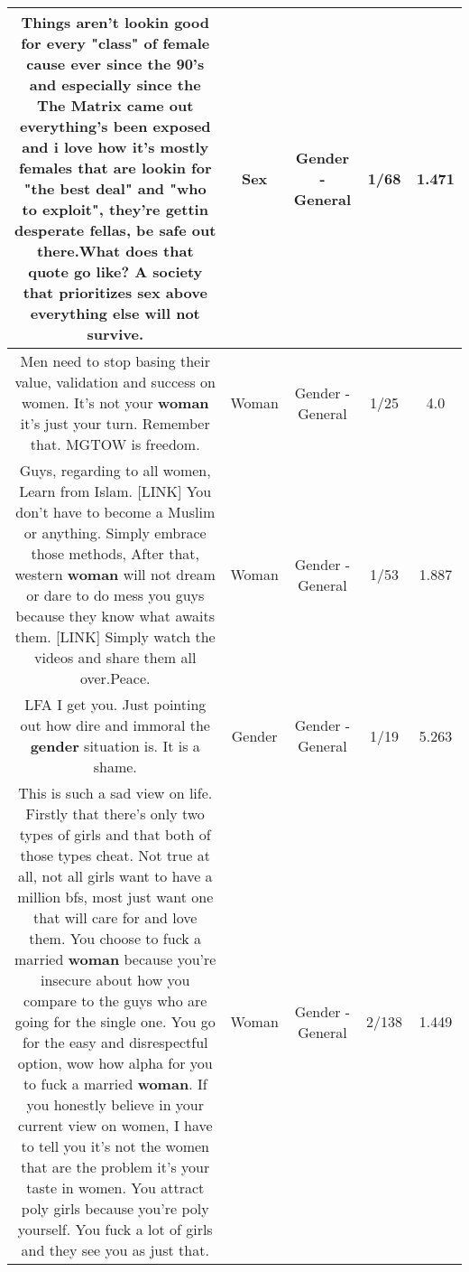 \documentclass[11pt]{article}
\newlength\mylength
\begin{document}
\begin{center}
\begin{longtable}{|C{.65\mylength}|C{.30\mylength}|C{.12\mylength}|C{.12\mylength}|C{.12\mylength}|}
  \small Things aren't lookin good for every "class" of female cause ever since the 90's and especially since the The Matrix came out everything's been exposed and i love how it's mostly females that are lookin for "the best deal" and "who to exploit", they're gettin desperate fellas, be safe out there.What does that quote go like? A society that prioritizes \textbf{sex} above everything else will not survive.\normalsize   & Sex & Gender - General & 1/68 & 1.471 \\  \hline
  \small Men need to stop basing their value, validation and success on women. It's not your \textbf{woman} it's just your turn. Remember that. MGTOW is freedom.\normalsize   & Woman & Gender - General & 1/25 & 4.0 \\  \hline
  \small Guys, regarding to all women, Learn from Islam. [LINK] You don't have to become a Muslim or anything. Simply embrace those methods, After that, western \textbf{woman} will not dream or dare to do mess you guys because they know what awaits them. [LINK] Simply watch the videos and share them all over.Peace.\normalsize   & Woman & Gender - General & 1/53 & 1.887 \\  \hline
  \small LFA I get you. Just pointing out how dire and immoral the \textbf{gender} situation is. It is a shame.\normalsize   & Gender & Gender - General & 1/19 & 5.263 \\  \hline
  \small This is such a sad view on life. Firstly that there's only two types of girls and that both of those types cheat. Not true at all, not all girls want to have a million bfs, most just want one that will care for and love them. You choose to fuck a married \textbf{woman} because you're insecure about how you compare to the guys who are going for the single one. You go for the easy and disrespectful option, wow how alpha for you to fuck a married \textbf{woman}. If you honestly believe in your current view on women, I have to tell you it's not the women that are the problem it's your taste in women. You attract poly girls because you're poly yourself. You fuck a lot of girls and they see you as just that.\normalsize   & Woman & Gender - General & 2/138 & 1.449 \\  \hline

\end{longtable}
\end{center}
\end{document}
